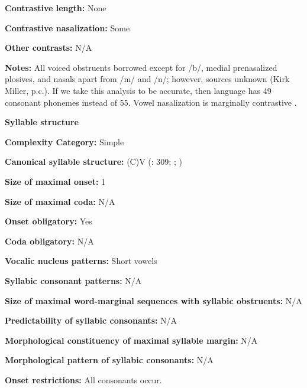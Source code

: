 \textbf{Contrastive length:} None



\textbf{Contrastive nasalization:} Some



\textbf{Other contrasts:} N/A



\textbf{Notes:} All voiced obstruents borrowed except for /b/, medial prenasalized plosives, and nasals apart from /m/ and /n/; however, sources unknown (Kirk Miller, p.c.). If we take this analysis to be accurate, then language has 49 consonant phonemes instead of 55. Vowel nasalization is marginally contrastive \citep[38]{Sands2013}.



\textbf{Syllable structure}



\textbf{Complexity Category:} Simple



\textbf{Canonical syllable structure:} (C)V (\citealt{TuckerEtAl1977}: 309; \citealt{SandsEtAl1996}; \citealt{Sands2013})



\textbf{Size of maximal onset:} 1



\textbf{Size of maximal coda:} N/A



\textbf{Onset obligatory:} Yes



\textbf{Coda obligatory:} N/A



\textbf{Vocalic nucleus patterns:} Short vowels



\textbf{Syllabic consonant patterns:} N/A



\textbf{Size of maximal word{}-marginal sequences with syllabic obstruents:} N/A



\textbf{Predictability of syllabic consonants:} N/A



\textbf{Morphological constituency of maximal syllable margin:} N/A



\textbf{Morphological pattern of syllabic consonants:} N/A



\textbf{Onset restrictions:} All consonants occur.



